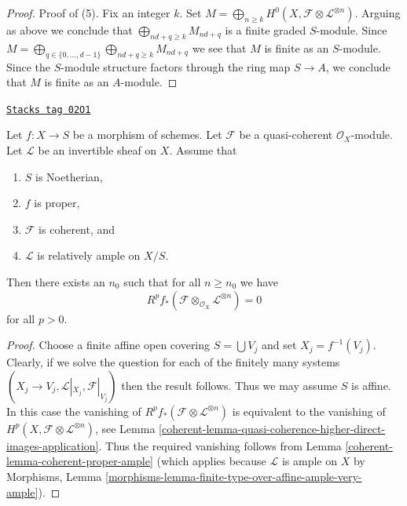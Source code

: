 \begin{proof}
\medskip\noindent
Proof of (5). Fix an integer $k$. Set
$M = \bigoplus_{n \geq k} H^0(X, \mathcal{F} \otimes \mathcal{L}^{\otimes n})$.
Arguing as above we conclude that $\bigoplus_{nd + q \geq k} M_{nd + q}$
is a finite graded $S$-module. Since
$M = \bigoplus_{q \in \{0, \ldots, d - 1\}}
\bigoplus_{nd + q \geq k} M_{nd + q}$
we see that $M$ is finite as an $S$-module. Since the $S$-module structure
factors through the ring map $S \to A$, we conclude that $M$ is finite
as an $A$-module.
\end{proof}

\begin{lemma}
\label{coherent-lemma-kill-by-twisting}
\href{https://stacks.math.columbia.edu/tag/02O1}{\texttt{Stacks tag 02O1}}

Let $f : X \to S$ be a morphism of schemes.
Let $\mathcal{F}$ be a quasi-coherent $\mathcal{O}_X$-module.
Let $\mathcal{L}$ be an invertible sheaf on $X$.
Assume that
\begin{enumerate}
\item $S$ is Noetherian,
\item $f$ is proper,
\item $\mathcal{F}$ is coherent, and
\item $\mathcal{L}$ is relatively ample on $X/S$.
\end{enumerate}
Then there exists an $n_0$ such that for all $n \geq n_0$
we have
$$
R^pf_*\left(\mathcal{F} \otimes_{\mathcal{O}_X} \mathcal{L}^{\otimes n}\right)
=
0
$$
for all $p > 0$.
\end{lemma}

\begin{proof}

Choose a finite affine open covering $S = \bigcup V_j$ and
set $X_j = f^{-1}(V_j)$.
Clearly, if we solve the question for each of the finitely many
systems $(X_j \to V_j, \mathcal{L}|_{X_j}, \mathcal{F}|_{V_j})$
then the result follows. Thus we may assume $S$ is affine.
In this case the vanishing of
$R^pf_*(\mathcal{F} \otimes \mathcal{L}^{\otimes n})$
is equivalent to the vanishing of
$H^p(X, \mathcal{F} \otimes \mathcal{L}^{\otimes n})$, see
Lemma \ref{coherent-lemma-quasi-coherence-higher-direct-images-application}.
Thus the required vanishing follows
from Lemma \ref{coherent-lemma-coherent-proper-ample} (which applies because
$\mathcal{L}$ is ample on $X$ by Morphisms, Lemma
\ref{morphisms-lemma-finite-type-over-affine-ample-very-ample}).
\end{proof}

